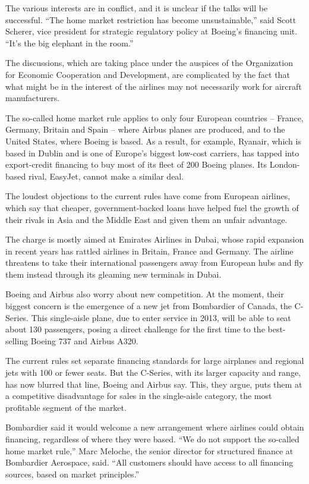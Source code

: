 ﻿\documentclass[12pt]{article}
\begin{document}
The various interests are in conflict, and it is unclear if the talks will be successful. ``The home
market restriction has become unsustainable,'' said Scott Scherer, vice president for strategic
regulatory policy at Boeing's financing unit. ``It's the big elephant in the room.''

The discussions, which are taking place under the auspices of the Organization for Economic
Cooperation and Development, are complicated by the fact that what might be in the interest of the
airlines may not necessarily work for aircraft manufacturers.

The so-called home market rule applies to only four European countries -- France, Germany, Britain
and Spain -- where Airbus planes are produced, and to the United States, where Boeing is based. As a
result, for example, Ryanair, which is based in Dublin and is one of Europe's biggest low-cost
carriers, has tapped into export-credit financing to buy most of its fleet of 200 Boeing planes. Its
London-based rival, EasyJet, cannot make a similar deal.

The loudest objections to the current rules have come from European airlines, which say that
cheaper, government-backed loans have helped fuel the growth of their rivals in Asia and the Middle
East and given them an unfair advantage.

The charge is mostly aimed at Emirates Airlines in Dubai, whose rapid expansion in recent years has
rattled airlines in Britain, France and Germany. The airline threatens to take their international
passengers away from European hubs and fly them instead through its gleaming new terminals in Dubai.

Boeing and Airbus also worry about new competition. At the moment, their biggest concern is the
emergence of a new jet from Bombardier of Canada, the C-Series. This single-aisle plane, due to
enter service in 2013, will be able to seat about 130 passengers, posing a direct challenge for the
first time to the best-selling Boeing 737 and Airbus A320.

The current rules set separate financing standards for large airplanes and regional jets with 100 or
fewer seats. But the C-Series, with its larger capacity and range, has now blurred that line, Boeing
and Airbus say. This, they argue, puts them at a competitive disadvantage for sales in the
single-aisle category, the most profitable segment of the market.

Bombardier said it would welcome a new arrangement where airlines could obtain financing, regardless
of where they were based. ``We do not support the so-called home market rule,'' Marc Meloche, the
senior director for structured finance at Bombardier Aerospace, said. ``All customers should have
access to all financing sources, based on market principles.''
\end{document}

